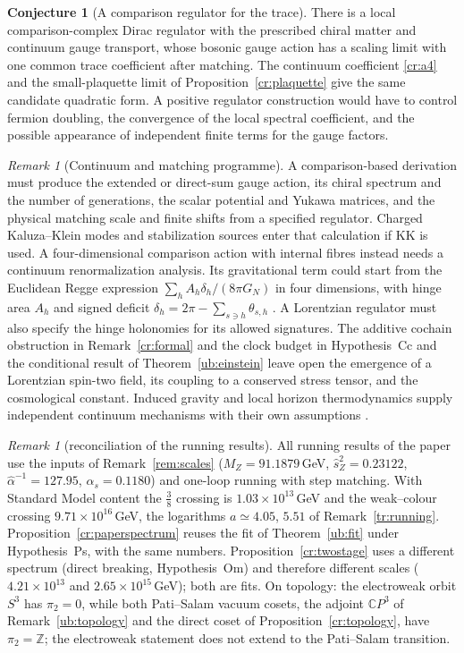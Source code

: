 \documentclass[aps,pra,onecolumn,superscriptaddress,nofootinbib,10pt]{revtex4-2}
\theoremstyle{definition}
\newtheorem{conjecture}[theorem]{Conjecture}
\theoremstyle{remark}
\newtheorem{remark}[theorem]{Remark}
\newcommand{\C}{\mathbb{C}}
\newcommand{\Z}{\mathbb{Z}}
\begin{document}
\begin{conjecture}[A comparison regulator for the trace]\label{cr:conjecture}
There is a local comparison-complex Dirac regulator with the
prescribed chiral matter and continuum gauge transport, whose
bosonic gauge action has a scaling limit with one common trace
coefficient after matching. The continuum coefficient
\eqref{cr:a4} and the small-plaquette limit of
Proposition~\ref{cr:plaquette} give the same candidate quadratic
form. A positive regulator construction would have to control
fermion doubling, the convergence of the local spectral
coefficient, and the possible appearance of independent
finite terms for the gauge factors.
\end{conjecture}

\begin{remark}[Continuum and matching programme]\label{cr:programme}
A comparison-based derivation must produce the extended or
direct-sum gauge action, its chiral spectrum and the number of
generations, the scalar potential and Yukawa matrices, and the
physical matching scale and finite shifts from a specified
regulator. Charged Kaluza--Klein modes and stabilization
sources enter that calculation if KK is used. A four-dimensional
comparison action with internal fibres instead needs a
continuum renormalization analysis. Its gravitational term
could start from the Euclidean Regge expression
$\sum_h A_h\delta_h/(8\pi G_N)$ in four dimensions, with hinge
area $A_h$ and signed deficit $\delta_h=2\pi-\sum_{s\ni h}\theta_{s,h}$
\cite{ub:regge}. A Lorentzian regulator must also specify the hinge holonomies for
its allowed signatures. The additive cochain obstruction in
Remark~\ref{cr:formal} and the clock budget in
Hypothesis~Cc and the conditional result of
Theorem~\ref{ub:einstein} leave open the emergence of a
Lorentzian spin-two field, its coupling to a conserved stress
tensor, and the cosmological constant. Induced gravity and
local horizon thermodynamics supply independent continuum
mechanisms with their own assumptions \cite{cr:sakharov,n1-jacobson}.
\end{remark}

\begin{remark}[reconciliation of the running results]\label{rem:crreconcile}
All running results of the paper use the inputs of Remark~\ref{rem:scales} ($M_Z=91.1879$\,GeV, $\hat s_Z^2=0.23122$, $\hat\alpha^{-1}=127.95$,
$\alpha_s=0.1180$) and one-loop running with step matching.  With Standard Model content
the $\tfrac38$ crossing is $1.03\times10^{13}$\,GeV and the weak--colour crossing $9.71\times10^{16}$\,GeV,
the logarithms $a\simeq4.05$, $5.51$ of Remark~\ref{tr:running}.  Proposition~\ref{cr:paperspectrum} reuses the fit of
Theorem~\ref{ub:fit} under Hypothesis~Ps, with the same numbers.  Proposition~\ref{cr:twostage} uses a different
spectrum (direct breaking, Hypothesis~Om) and therefore different scales ($4.21\times10^{13}$ and $2.65\times10^{15}$\,GeV); both are
fits.  On topology: the electroweak orbit $S^3$ has $\pi_2=0$, while both Pati--Salam vacuum cosets, the adjoint
$\C P^3$ of Remark~\ref{ub:topology} and the direct coset of Proposition~\ref{cr:topology}, have $\pi_2=\Z$; the electroweak
statement does not extend to the Pati--Salam transition.
\end{remark}
\end{document}
